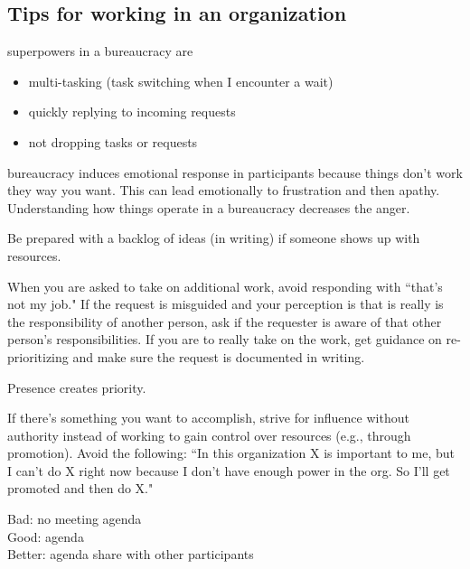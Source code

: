 \subsection{Tips for working in an organization}

superpowers in a bureaucracy are
\begin{itemize}
    \item multi-tasking (task switching when I encounter a wait)
    \item quickly replying to incoming requests
    \item not dropping tasks or requests
\end{itemize}

bureaucracy induces emotional response in participants because things don't work they way you want. This can lead emotionally to frustration and then apathy. Understanding how things operate in a bureaucracy decreases the anger.




Be prepared with a backlog of ideas (in writing) if someone shows up with resources.

When you are asked to take on additional work, avoid responding with ``that's not my job." If the request is misguided and your perception is that is really is the responsibility of another person, ask if the requester is aware of that other person's responsibilities. If you are to really take on the work, get guidance on re-prioritizing and make sure the request is documented in writing. 

Presence creates priority.

If there's something you want to accomplish, strive for influence without authority instead of working to gain control over resources (e.g., through promotion). Avoid the following: ``In this organization X is important to me, but I can't do X right now because I don't have enough power in the org. So I'll get promoted and then do X."


Bad: no meeting agenda\\
Good: agenda\\
Better: agenda share with other participants

